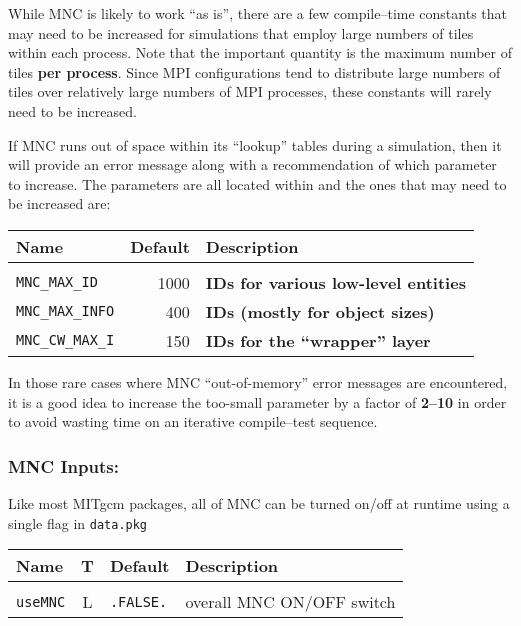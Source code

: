 While MNC is likely to work ``as is'', there are a few compile--time
constants that may need to be increased for simulations that employ
large numbers of tiles within each process.  Note that the important
quantity is the maximum number of tiles \textbf{per process}.  Since
MPI configurations tend to distribute large numbers of tiles over
relatively large numbers of MPI processes, these constants will rarely
need to be increased.

If MNC runs out of space within its ``lookup'' tables during a
simulation, then it will provide an error message along with a
recommendation of which parameter to increase.  The parameters are all
located within 
and the ones that may need to be increased are:

\begin{center}
  {\footnotesize
    \begin{tabular}[htb]{|l|r|l|}\hline
      \textbf{Name}  &  
      \textbf{Default}  &  \textbf{Description}  \\\hline
      &  &  \\
      \texttt{MNC\_MAX\_ID}  &  1000  & 
      \textbf{IDs for various low-level entities}  \\
      \texttt{MNC\_MAX\_INFO}  &   400  & 
      \textbf{IDs (mostly for object sizes)}  \\
      \texttt{MNC\_CW\_MAX\_I}  &  150  & 
      \textbf{IDs for the ``wrapper'' layer}  \\\hline
    \end{tabular}
  }
\end{center}

In those rare cases where MNC ``out-of-memory'' error messages are
encountered, it is a good idea to increase the too-small parameter by
a factor of \textbf{2--10} in order to avoid wasting time on an
iterative compile--test sequence.


\subsubsection{MNC Inputs:}

Like most MITgcm packages, all of MNC can be turned on/off at runtime
using a single flag in \texttt{data.pkg}
\begin{center}
  {\footnotesize
    \begin{tabular}[htb]{|l|c|l|l|}\hline
      \textbf{Name}  &  \textbf{T}  &  
      \textbf{Default}  &  \textbf{Description}  \\\hline
      &  &  &  \\
      \texttt{useMNC}  &  L  & \texttt{.FALSE.}  &  
      overall MNC ON/OFF switch  \\\hline
    \end{tabular}
  }
\end{center}

